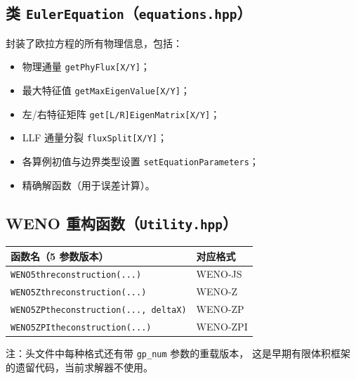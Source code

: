 \documentclass{article}
\numberwithin{equation}{section}
\begin{document}
\subsection{类 \texttt{EulerEquation}（\texttt{equations.hpp}）}

封装了欧拉方程的所有物理信息，包括：
\begin{itemize}
    \item 物理通量 \texttt{getPhyFlux[X/Y]}；
    \item 最大特征值 \texttt{getMaxEigenValue[X/Y]}；
    \item 左/右特征矩阵 \texttt{get[L/R]EigenMatrix[X/Y]}；
    \item LLF 通量分裂 \texttt{fluxSplit[X/Y]}；
    \item 各算例初值与边界类型设置 \texttt{setEquationParameters}；
    \item 精确解函数（用于误差计算）。
\end{itemize}

\subsection{WENO 重构函数（\texttt{Utility.hpp}）}

\begin{table}[H]
\centering
\begin{tabular}{ll}
\toprule
函数名（5 参数版本） & 对应格式 \\
\midrule
\texttt{WENO5threconstruction(...)} & WENO-JS \\
\texttt{WENO5Zthreconstruction(...)} & WENO-Z \\
\texttt{WENO5ZPtheconstruction(..., deltaX)} & WENO-ZP \\
\texttt{WENO5ZPItheconstruction(...)} & WENO-ZPI \\
\bottomrule
\end{tabular}
\end{table}

注：头文件中每种格式还有带 \texttt{gp\_num} 参数的重载版本，
这是早期有限体积框架的遗留代码，当前求解器不使用。
\end{document}
